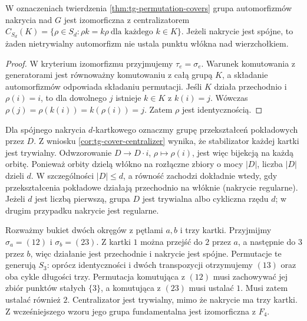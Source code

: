 \begin{wniosek}
\label{cor:tg-cover-centralizer}
W oznaczeniach twierdzenia \ref{thm:tg-permutation-covers}
grupa automorfizmów nakrycia nad $G$ jest izomorficzna
z centralizatorem
$C_{S_d}(K)=\{\rho\in S_d:\rho k=k\rho\ \text{dla każdego }k\in K\}$.
Jeżeli nakrycie jest spójne, to żaden nietrywialny
automorfizm nie ustala punktu włókna nad wierzchołkiem.
\end{wniosek}
\begin{proof}
W kryterium izomorfizmu przyjmujemy $\tau_e=\sigma_e$.
Warunek komutowania z generatorami jest równoważny
komutowaniu z całą grupą $K$, a składanie automorfizmów
odpowiada składaniu permutacji.
Jeśli $K$ działa przechodnio i $\rho(i)=i$, to dla
dowolnego $j$ istnieje $k\in K$ z $k(i)=j$.
Wówczas $\rho(j)=\rho(k(i))=k(\rho(i))=j$.
Zatem $\rho$ jest identycznością.
\end{proof}

\begin{uwaga}
Dla spójnego nakrycia $d$-kartkowego oznaczmy
grupę przekształceń pokładowych przez $D$.
Z wniosku \ref{cor:tg-cover-centralizer} wynika,
że stabilizator każdej kartki jest trywialny.
Odwzorowanie $D\to D\cdot i$, $\rho\mapsto\rho(i)$,
jest więc bijekcją na każdą orbitę. Ponieważ
orbity dzielą włókno na rozłączne zbiory o mocy
$|D|$, liczba $|D|$ dzieli $d$. W szczególności
$|D|\leq d$, a równość zachodzi dokładnie wtedy,
gdy przekształcenia pokładowe działają przechodnio
na włóknie (nakrycie regularne).
Jeżeli $d$ jest liczbą pierwszą, grupa $D$ jest
trywialna albo cykliczna rzędu $d$; w drugim
przypadku nakrycie jest regularne.
\end{uwaga}

\begin{przyklad}
\label{ex:tg-cover-nonregular}
Rozważmy bukiet dwóch okręgów z pętlami $a,b$ i trzy kartki.
Przyjmijmy $\sigma_a=(12)$ i $\sigma_b=(23)$.
Z kartki $1$ można przejść do $2$ przez $a$,
a następnie do $3$ przez $b$, więc działanie jest
przechodnie i nakrycie jest spójne. Permutacje te
generują $S_3$: oprócz identyczności i dwóch
transpozycji otrzymujemy $(13)$ oraz oba cykle
długości trzy.
Permutacja komutująca z $(12)$ musi zachowywać
jej zbiór punktów stałych $\{3\}$, a komutująca
z $(23)$ musi ustalać $1$. Musi zatem ustalać
również $2$. Centralizator jest trywialny,
mimo że nakrycie ma trzy kartki.
Z wcześniejszego wzoru jego grupa fundamentalna
jest izomorficzna z $F_4$.
\end{przyklad}

